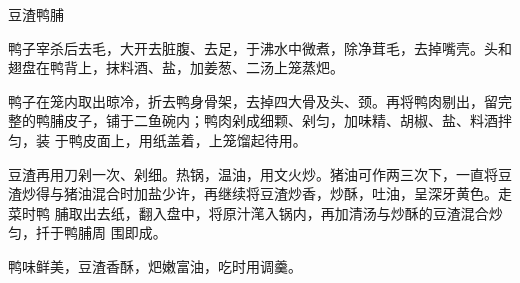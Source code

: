 %
%
%
%
%
%
%
\begin{recipe}{豆渣鸭脯}

\ingredients


\preparation

\step 鸭子宰杀后去毛，大开去脏腹、去足，于沸水中微煮，除净茸毛，去掉嘴壳。头和
翅盘在鸭背上，抹料酒、盐，加姜葱、二汤上笼蒸𤆵。

\step 鸭子在笼内取出晾冷，折去鸭身骨架，去掉四大骨及头、颈。再将鸭肉剔出，留完
整的鸭脯皮子，铺于二鱼碗内；鸭肉剁成细颗、剁匀，加味精、胡椒、盐、料酒拌匀，装
于鸭皮面上，用纸盖着，上笼馏起待用。

\step 豆渣再用刀剁一次、剁细。热锅，温油，用文火炒。猪油可作两三次下，一直将豆
渣炒得与猪油混合时加盐少许，再继续将豆渣炒香，炒酥，吐油，呈深牙黄色。走菜时鸭
脯取出去纸，翻入盘中，将原汁滗入锅内，再加清汤与炒酥的豆渣混合炒匀，扦于鸭脯周
围即成。

\features

鸭味鲜美，豆渣香酥，𤆵嫩富油，吃时用调羹。

\end{recipe}

